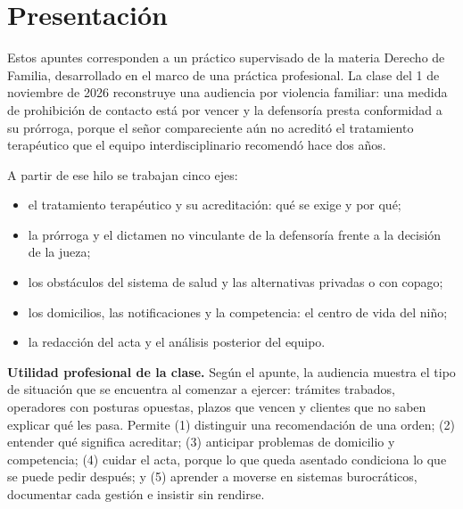 \documentclass[12pt,oneside]{book}
\begin{document}
\chapter*{Presentaci\'on}

Estos apuntes corresponden a un pr\'actico supervisado de la materia Derecho de Familia, desarrollado en el marco de una pr\'actica profesional. La clase del 1 de noviembre de 2026 reconstruye una audiencia por violencia familiar: una medida de prohibici\'on de contacto est\'a por vencer y la defensor\'ia presta conformidad a su pr\'orroga, porque el se\~nor compareciente a\'un no acredit\'o el tratamiento terap\'eutico que el equipo interdisciplinario recomend\'o hace dos a\~nos.

A partir de ese hilo se trabajan cinco ejes:

\begin{itemize}
    \item el tratamiento terap\'eutico y su acreditaci\'on: qu\'e se exige y por qu\'e;
    \item la pr\'orroga y el dictamen no vinculante de la defensor\'ia frente a la decisi\'on de la jueza;
    \item los obst\'aculos del sistema de salud y las alternativas privadas o con copago;
    \item los domicilios, las notificaciones y la competencia: el centro de vida del ni\~no;
    \item la redacci\'on del acta y el an\'alisis posterior del equipo.
\end{itemize}

\begin{important}
\textbf{Utilidad profesional de la clase.} Seg\'un el apunte, la audiencia muestra el tipo de situaci\'on que se encuentra al comenzar a ejercer: tr\'amites trabados, operadores con posturas opuestas, plazos que vencen y clientes que no saben explicar qu\'e les pasa. Permite (1) distinguir una recomendaci\'on de una orden; (2) entender qu\'e significa acreditar; (3) anticipar problemas de domicilio y competencia; (4) cuidar el acta, porque lo que queda asentado condiciona lo que se puede pedir despu\'es; y (5) aprender a moverse en sistemas burocr\'aticos, documentar cada gesti\'on e insistir sin rendirse.
\end{important}
\end{document}
